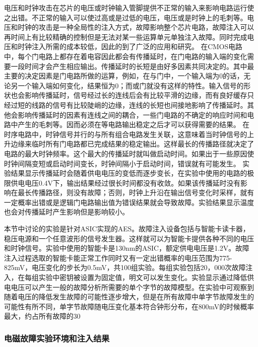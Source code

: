 \documentclass[a4paper,12pt]{article}
\begin{document}
\begin{CJK}{UTF8}{gkai}
电压和时钟攻击在芯片的电压或时钟输入管脚提供不正常的输入来影响电路运行使之出错。不正常的输入可以使过高或是过低的电压，电压或是时钟上的毛刺等。电压和时钟的攻击是一种全局性的注入方式，故障影响整个芯片电路，故障注入可以再时间上有比较精确的控制但是无法对某一些运算单元单独注入故障。同时完成电压和时钟注入所需的成本较低，因此的到了广泛的应用和研究。
在CMOS电路中，每个门电路上都存在着电容因此都会有传播延时，在门电路的输入端的变化需要一段时间才会产生相应输出。传播延时的长短是由好多因素共同决定的。其中最主要的决定因素是门电路所做的运算，例如，在与门中，一个输入端为0的话，无论另一个输入端如何变化，结果恒为0；而或门就没有这样的特性。输入信号的形状也会影响传播延时，信号经过长的连线后会有比较平滑的边缘，而有良好缓存只经过短的线路的信号有比较陡峭的边缘，连线的长短也间接地影响了传播延时。其他会影响传播延时的因素有连线之间的耦合，一些门电路的不确定的响应时间和电路中产生的毛刺等。因而必须在等电路输出稳定之后才可以获得需要的结果。
在时序电路中，时钟信号并行的与所有组合电路发生关联，这意味着当时钟信号的上升边缘来临时所有门电路都已完成结果的稳定输出。这样最长的传播路径就决定了电路的最大时钟频率。这个最大的传播延时就叫做启动时间。如果出于一些原因使时钟间隔变短或启动时间变长，时钟间隔小于启动时间，错误就有可能发生。
实验结果显示传播延时会随着供电电压的变低而逐步变长，在实验中使用的电路的极限供电电压0.4V下，输出结果经过很长时间都没有收敛。如果该传播延时没有影响在最长传播路径，则没有故障；否则，时钟上升沿在输出信号变化时采样，就有一定概率出错或是逻辑门电路输出值为错误结果就会导致故障。实验结果显示温度也会对传播延时产生影响但是影响较小。

本节中讨论的实验是针对ASIC实现的AES。故障注入设备包括与智能卡读卡器，稳压电源和一个任意波形的信号发生器。这样就可以为智能卡提供各种不同的电压和时钟信号。实验中使用的智能卡是130nm的ASIC，额定供电电压是1.2V。故障注入过程选取的智能卡能正常工作同时又有一定出错概率的电压范围为775-825mV，电压变化的步长为0.5mV，共100组实验。每组实验包括20，000次故障注入，在每组实验中密钥被设置为固定值，明文可以发生变化。实验显示通过降低供电电压可以产生一般的故障分析所需要的单个字节的故障模型。在实验中可观察到随着电压的降低发生故障的可能性逐步增大，但是在所有故障中单字节故障发生的可能性有所不同，单字节故障随电压变化基本符合钟形分布，在800mV的时候概率最大，约占所有故障的30%

\subsubsection{电磁故障实验环境和注入结果}


\end{CJK}
\end{document}
